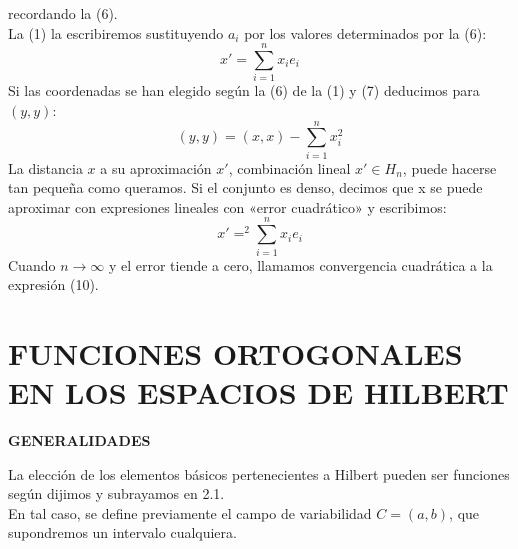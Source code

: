 recordando la (6).\\
La (1) la escribiremos sustituyendo $ a_{i} $ por los valores determinados por la (6):
\begin{equation}
x' = \sum_{i = 1}^{n}x_{i}e_{i}
\end{equation}
Si las coordenadas se han elegido según la (6) de la (1) y (7) deducimos para $ (y, y) $:
\begin{equation}
(y, y) = (x, x) -  \sum_{i = 1}^{n}x_{i}^{2}
\end{equation}
La distancia $ x $ a su aproximación $ x' $, combinación lineal $ x' \in H_{n} $, puede hacerse tan
pequeña como queramos. Si el conjunto es denso, decimos que x se puede aproximar con expresiones lineales con «error cuadrático» y escribimos:
\begin{equation}
x' =^{2} \sum_{i = 1}^{n}x_{i}e_{i}
\end{equation}
Cuando $ n \rightarrow \infty $ y el error tiende a cero, llamamos convergencia cuadrática a la expresión (10).

\section{FUNCIONES ORTOGONALES EN LOS ESPACIOS DE HILBERT}
	\setcounter{equation}{0}%
	
\textbf{GENERALIDADES}

La elección de los elementos básicos pertenecientes a Hilbert pueden ser funciones según dijimos y subrayamos en 2.1.\\

En tal caso, se define previamente el campo de variabilidad $ C =(a, b) $, que
supondremos un intervalo cualquiera.\\

